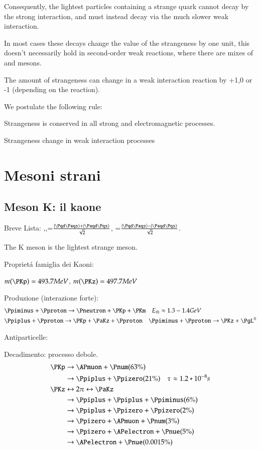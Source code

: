 \documentclass[main.tex]{subfiles}
\begin{document}
Consequently, the lightest particles containing a strange quark cannot decay by the strong interaction, and must instead decay via the much slower weak interaction.

In most cases these decays change the value of the strangeness by one unit, this doesn't necessarily hold in second-order weak reactions, where there are mixes of \PKzero and \APK mesons. 

The amount of strangeness can change in a weak interaction reaction by +1,0 or -1 (depending on the reaction).

We postulate the following rule:
\begin{enumerate*}
\item Strangeness is conserved in all strong and electromagnetic processes.
\item Strangeness change in weak interaction processes
\end{enumerate*}

\section{Mesoni strani} 

\subsection{Meson K: il kaone}\label{subsec:kaon}

Breve Lista: \PKpm,\PKzero,\PKzS=$\frac{\ket{\Pqd\Paqs}+\ket{\Paqd\Pqs}}{\sqrt{2}}$, \PKzL=$\frac{\ket{\Pqd\Paqs}-\ket{\Paqd\Pqs}}{\sqrt{2}}$.

The K meson is the lightest strange meson.

Propriet\'a famiglia dei Kaoni:
\begin{itemize*}
\item $m(\PKp)=493.7 MeV$, $m(\PKz)=497.7 MeV$
\item Produzione (interazione forte):
\begin{align*}
&\Ppiminus+\Pproton\to\Pneutron+\PKp+\PKm\quad E_{th}\approx1.3-1.4 GeV\\ &\Ppiplus+\Pproton\to\PKp+\PaKz+\Pproton\quad\Ppiminus+\Pproton\to\PKz+\PgL^0
\end{align*}
\item Antiparticelle:   \PaKz
\item Decadimento: processo debole.
\begin{align*}
\PKp&\to\APmuon+\Pnum (63\%)\\
&\to\Ppiplus+\Ppizero (21 \%)\quad\tau\approx1.2*10^{-8} s\\
\PKz&\leftrightarrow2\pi\leftrightarrow\PaKz\\
&\to\Ppiplus+\Ppiplus+\Ppiminus(6\%)\\
&\to\Ppiplus+\Ppizero+\Ppizero (2\%)\\
&\to\Ppizero+\APmuon+\Pnum (3\%)\\
&\to\Ppizero+\APelectron+\Pnue (5\%)\\
&\to\APelectron+\Pnue (0.0015\%)
\end{align*}
\end{itemize*}
\end{document}
